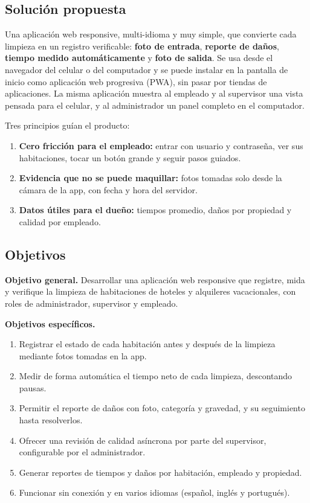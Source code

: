 \documentclass[11pt,a4paper]{article}
\begin{document}
\subsection{Solución propuesta}

Una aplicación web responsive, multi-idioma y muy simple, que convierte cada limpieza en un registro verificable: \textbf{foto de entrada}, \textbf{reporte de daños}, \textbf{tiempo medido automáticamente} y \textbf{foto de salida}. Se usa desde el navegador del celular o del computador y se puede instalar en la pantalla de inicio como aplicación web progresiva (PWA), sin pasar por tiendas de aplicaciones. La misma aplicación muestra al empleado y al supervisor una vista pensada para el celular, y al administrador un panel completo en el computador.

Tres principios guían el producto:

\begin{enumerate}[leftmargin=1.4em]
  \item \textbf{Cero fricción para el empleado:} entrar con usuario y contraseña, ver sus habitaciones, tocar un botón grande y seguir pasos guiados.
  \item \textbf{Evidencia que no se puede maquillar:} fotos tomadas solo desde la cámara de la app, con fecha y hora del servidor.
  \item \textbf{Datos útiles para el dueño:} tiempos promedio, daños por propiedad y calidad por empleado.
\end{enumerate}

\subsection{Objetivos}

\textbf{Objetivo general.} Desarrollar una aplicación web responsive que registre, mida y verifique la limpieza de habitaciones de hoteles y alquileres vacacionales, con roles de administrador, supervisor y empleado.

\textbf{Objetivos específicos.}
\begin{enumerate}[leftmargin=1.4em]
  \item Registrar el estado de cada habitación antes y después de la limpieza mediante fotos tomadas en la app.
  \item Medir de forma automática el tiempo neto de cada limpieza, descontando pausas.
  \item Permitir el reporte de daños con foto, categoría y gravedad, y su seguimiento hasta resolverlos.
  \item Ofrecer una revisión de calidad asíncrona por parte del supervisor, configurable por el administrador.
  \item Generar reportes de tiempos y daños por habitación, empleado y propiedad.
  \item Funcionar sin conexión y en varios idiomas (español, inglés y portugués).
\end{enumerate}
\end{document}
